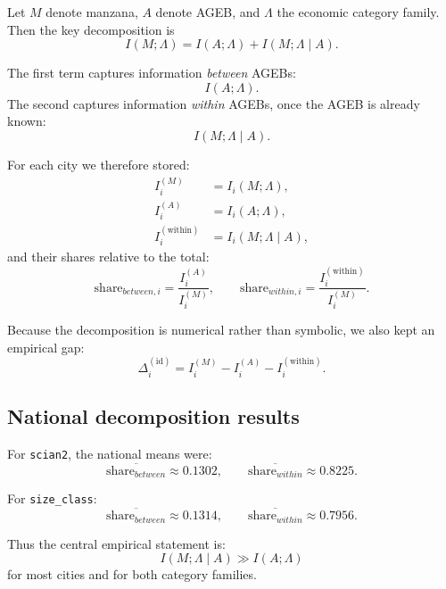 \documentclass[11pt]{article}
\begin{document}
Let \(M\) denote manzana, \(A\) denote AGEB, and \(\Lambda\) the economic category family. Then the key decomposition is
\begin{equation}
I(M;\Lambda)
=
I(A;\Lambda)+I(M;\Lambda\mid A).
\label{eq:mi-decomp}
\end{equation}

The first term captures information \emph{between} AGEBs:
\begin{equation}
I(A;\Lambda).
\end{equation}
The second captures information \emph{within} AGEBs, once the AGEB is already known:
\begin{equation}
I(M;\Lambda\mid A).
\end{equation}

For each city we therefore stored:
\begin{align}
I_i^{(M)} &= I_i(M;\Lambda),\\
I_i^{(A)} &= I_i(A;\Lambda),\\
I_i^{(\mathrm{within})} &= I_i(M;\Lambda\mid A),
\end{align}
and their shares relative to the total:
\begin{equation}
\text{share}_{between,i}
=
\frac{I_i^{(A)}}{I_i^{(M)}},
\qquad
\text{share}_{within,i}
=
\frac{I_i^{(\mathrm{within})}}{I_i^{(M)}}.
\end{equation}

Because the decomposition is numerical rather than symbolic, we also kept an empirical gap:
\begin{equation}
\Delta_i^{(\mathrm{id})}
=
I_i^{(M)} - I_i^{(A)} - I_i^{(\mathrm{within})}.
\end{equation}

\subsection{National decomposition results}

For \texttt{scian2}, the national means were:
\begin{equation}
\overline{\text{share}_{between}}
\approx 0.1302,
\qquad
\overline{\text{share}_{within}}
\approx 0.8225.
\end{equation}

For \texttt{size\_class}:
\begin{equation}
\overline{\text{share}_{between}}
\approx 0.1314,
\qquad
\overline{\text{share}_{within}}
\approx 0.7956.
\end{equation}

Thus the central empirical statement is:
\begin{equation}
I(M;\Lambda\mid A) \gg I(A;\Lambda)
\end{equation}
for most cities and for both category families.
\end{document}
